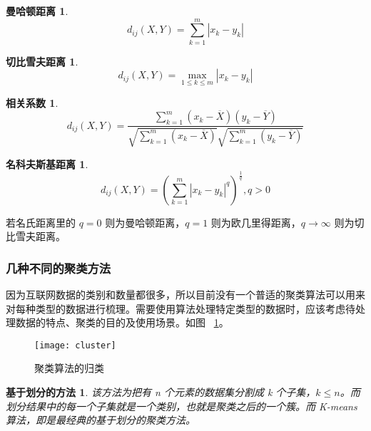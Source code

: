 \newtheorem*{manhadun}{曼哈顿距离}
\begin{manhadun}
    \begin{equation}
        d_{ij}(X,Y) = \sum_{k=1}^m|x_k-y_k|
    \end{equation}
\end{manhadun}

\newtheorem*{qiebixuefu}{切比雪夫距离}
\begin{qiebixuefu}
    \begin{equation}
        d_{ij}(X,Y) = \max \limits_{1 \leq k \leq m}|x_k - y_k|
    \end{equation}
\end{qiebixuefu}

\newtheorem*{xiangguanxishu}{相关系数}
\begin{xiangguanxishu}
    \begin{equation}
        d_{ij}(X,Y) = \frac{\sum_{k=1}^m(x_k-\overline{X})(y_k-\overline{Y})}{\sqrt{\sum_{k=1}^m(x_k-\overline{X})}\sqrt{\sum_{k=1}^m(y_k-\overline{Y})}}
    \end{equation}
\end{xiangguanxishu}

\newtheorem*{mingkefusiji}{名科夫斯基距离}
\begin{mingkefusiji}
    \begin{equation}
        d_{ij}(X,Y) = \left( \sum_{k=1}^m|x_k-y_k|^q \right) ^ \frac{1}{q}, q > 0
    \end{equation}
\end{mingkefusiji}

若名氏距离里的 $q=0$ 则为曼哈顿距离，$q=1$ 则为欧几里得距离，$q\to \infty$ 则为切比雪夫距离。

\subsubsection{几种不同的聚类方法}
因为互联网数据的类别和数量都很多，所以目前没有一个普适的聚类算法可以用来对每种类型的数据进行梳理。需要使用算法处理特定类型的数据时，应该考虑待处理数据的特点、聚类的目的及使用场景。如图 ~\ref{fig:cluster}。

\begin{figure}[ht]
\centering
\texttt{[image: cluster]}
\caption{聚类算法的归类}\label{fig:cluster}
\end{figure}

\newtheorem*{huafenfa}{基于划分的方法}
\begin{huafenfa}
    该方法为把有 n 个元素的数据集分割成 k 个子集，$k \leq n$。而划分结果中的每一个子集就是一个类别，也就是聚类之后的一个簇。而 K-means 算法，即是最经典的基于划分的聚类方法。
\end{huafenfa}

